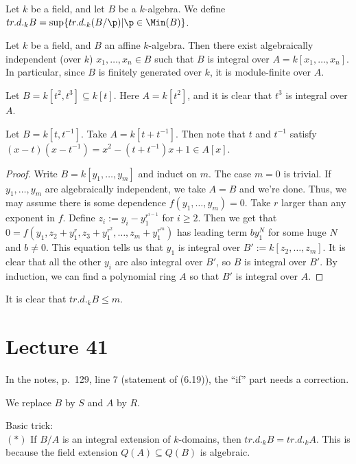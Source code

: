  \begin{definition}
   Let $k$ be a field, and let $B$ be a $k$-algebra. We define $tr.d._k B = \sup
   \{tr.d._k (B/\p)|\p\in \Min(B)\}$.
 \end{definition}
 \begin{theorem}
   Let $k$ be a field, and $B$ an affine $k$-algebra. Then there exist algebraically
   independent (over $k$) $x_1,\dots, x_n\in B$ such that $B$ is integral over
   $A=k[x_1,\dots, x_n]$. In particular, since $B$ is finitely generated over $k$, it is
   module-finite over $A$.
 \end{theorem}
 \begin{example}
   Let $B=k[t^2,t^3]\subseteq k[t]$. Here $A=k[t^2]$, and it is clear that $t^3$ is
   integral over $A$.
 \end{example}
 \begin{example}
   Let $B=k[t,t^{-1}]$. Take $A=k[t+t^{-1}]$. Then note that $t$ and $t^{-1}$ satisfy
   $(x-t)(x-t^{-1}) = x^2-(t+t^{-1})x+1\in A[x]$.
 \end{example}
 \begin{proof}
   Write $B=k[y_1,\dots, y_m]$ and induct on $m$. The case $m=0$ is trivial. If
   $y_1,\dots, y_m$ are algebraically independent, we take $A=B$ and we're done. Thus, we
   may assume there is some dependence $f(y_1,\dots, y_m)=0$. Take $r$ larger than any
   exponent in $f$. Define $z_i:=y_i-y_1^{r^{i-1}}$ for $i\ge 2$. Then we get that
   $0=f(y_1,z_2+y_1^{r}, z_3+y_1^{r^2}, \dots, z_m + y_1^{r^m})$ has leading term
   $by_1^N$ for some huge $N$ and $b\neq 0$. This equation tells us that $y_1$ is
   integral over $B':=k[z_2,\dots, z_m]$. It is clear that all the other $y_i$ are also
   integral over $B'$, so $B$ is integral over $B'$. By induction, we can find a
   polynomial ring $A$ so that $B'$ is integral over $A$.
 \end{proof}
 It is clear that $tr.d._k B\le m$.
 \setcounter{lecture}{41}
 \section{Lecture 41}

 In the notes, p.~129, line 7 (statement of (6.19)), the ``if'' part needs a correction.

 We replace $B$ by $S$ and $A$ by $R$.

 Basic trick:\\
 $(\ast)$ If $B/A$ is an integral extension of $k$-domains, then $tr.d._k B=tr.d._k A$.
 This is because the field extension $Q(A)\subseteq Q(B)$ is algebraic.

